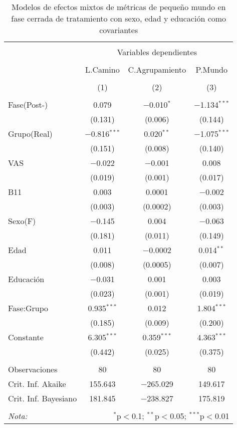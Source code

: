\begin{table}[!ht] \centering
  \caption{Modelos de efectos mixtos de métricas de pequeño mundo en fase cerrada de tratamiento con sexo, edad y educación como covariantes}
  \label{tab:memT2}
\begin{tabular}{@{\extracolsep{5pt}}lccc}
\\[-1.8ex]\hline
\hline \\[-1.8ex]
 & \multicolumn{3}{c}{Variables dependientes} \\
\cline{2-4}
\\[-1.8ex] & L.Camino & C.Agrupamiento & P.Mundo \\
\\[-1.8ex] & (1) & (2) & (3)\\
\hline \\[-1.8ex]
 Fase(Post-) & 0.079 & $-$0.010$^{*}$ & $-$1.134$^{***}$ \\
  & (0.131) & (0.006) & (0.144) \\
  Grupo(Real) & $-$0.816$^{***}$ & 0.020$^{**}$ & $-$1.075$^{***}$ \\
  & (0.151) & (0.008) & (0.140) \\
  VAS & $-$0.022 & $-$0.001 & 0.008 \\
  & (0.019) & (0.001) & (0.017) \\
  B11 & 0.003 & 0.0001 & $-$0.002 \\
  & (0.003) & (0.0002) & (0.003) \\
  Sexo(F) & $-$0.145 & 0.004 & $-$0.063 \\
  & (0.181) & (0.011) & (0.149) \\
  Edad & 0.011 & $-$0.0002 & 0.014$^{**}$ \\
  & (0.008) & (0.0005) & (0.007) \\
  Educación & $-$0.031 & 0.001 & 0.003 \\
  & (0.023) & (0.001) & (0.019) \\
  Fase:Grupo & 0.935$^{***}$ & 0.012 & 1.804$^{***}$ \\
  & (0.185) & (0.009) & (0.200) \\
  Constante & 6.305$^{***}$ & 0.359$^{***}$ & 4.363$^{***}$ \\
  & (0.442) & (0.025) & (0.375) \\
 \hline \\[-1.8ex]
Observaciones & 80 & 80 & 80 \\
Crit. Inf. Akaike & 155.643 & $-$265.029 & 149.617 \\
Crit. Inf. Bayesiano & 181.845 & $-$238.827 & 175.819 \\
\hline
\hline \\[-1.8ex]
\textit{Nota:}  & \multicolumn{3}{r}{$^{*}$p$<$0.1; $^{**}$p$<$0.05; $^{***}$p$<$0.01} \\
\end{tabular}
\end{table}

